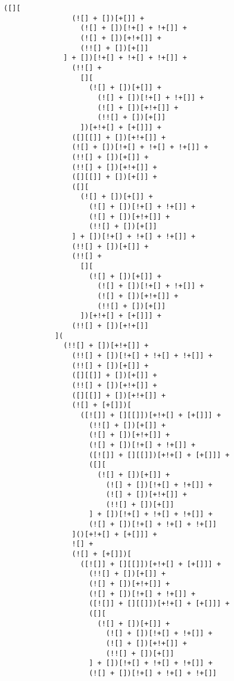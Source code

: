 \begin{lstlisting}[style=basicStyle, caption=alert('XSS') in JSFuck, label={lst:alertxssjsfuck}]
              ([][
                (![] + [])[+[]] +
                  (![] + [])[!+[] + !+[]] +
                  (![] + [])[+!+[]] +
                  (!![] + [])[+[]]
              ] + [])[!+[] + !+[] + !+[]] +
                (!![] +
                  [][
                    (![] + [])[+[]] +
                      (![] + [])[!+[] + !+[]] +
                      (![] + [])[+!+[]] +
                      (!![] + [])[+[]]
                  ])[+!+[] + [+[]]] +
                ([][[]] + [])[+!+[]] +
                (![] + [])[!+[] + !+[] + !+[]] +
                (!![] + [])[+[]] +
                (!![] + [])[+!+[]] +
                ([][[]] + [])[+[]] +
                ([][
                  (![] + [])[+[]] +
                    (![] + [])[!+[] + !+[]] +
                    (![] + [])[+!+[]] +
                    (!![] + [])[+[]]
                ] + [])[!+[] + !+[] + !+[]] +
                (!![] + [])[+[]] +
                (!![] +
                  [][
                    (![] + [])[+[]] +
                      (![] + [])[!+[] + !+[]] +
                      (![] + [])[+!+[]] +
                      (!![] + [])[+[]]
                  ])[+!+[] + [+[]]] +
                (!![] + [])[+!+[]]
            ](
              (!![] + [])[+!+[]] +
                (!![] + [])[!+[] + !+[] + !+[]] +
                (!![] + [])[+[]] +
                ([][[]] + [])[+[]] +
                (!![] + [])[+!+[]] +
                ([][[]] + [])[+!+[]] +
                (![] + [+[]])[
                  ([![]] + [][[]])[+!+[] + [+[]]] +
                    (!![] + [])[+[]] +
                    (![] + [])[+!+[]] +
                    (![] + [])[!+[] + !+[]] +
                    ([![]] + [][[]])[+!+[] + [+[]]] +
                    ([][
                      (![] + [])[+[]] +
                        (![] + [])[!+[] + !+[]] +
                        (![] + [])[+!+[]] +
                        (!![] + [])[+[]]
                    ] + [])[!+[] + !+[] + !+[]] +
                    (![] + [])[!+[] + !+[] + !+[]]
                ]()[+!+[] + [+[]]] +
                ![] +
                (![] + [+[]])[
                  ([![]] + [][[]])[+!+[] + [+[]]] +
                    (!![] + [])[+[]] +
                    (![] + [])[+!+[]] +
                    (![] + [])[!+[] + !+[]] +
                    ([![]] + [][[]])[+!+[] + [+[]]] +
                    ([][
                      (![] + [])[+[]] +
                        (![] + [])[!+[] + !+[]] +
                        (![] + [])[+!+[]] +
                        (!![] + [])[+[]]
                    ] + [])[!+[] + !+[] + !+[]] +
                    (![] + [])[!+[] + !+[] + !+[]]

\end{lstlisting}
